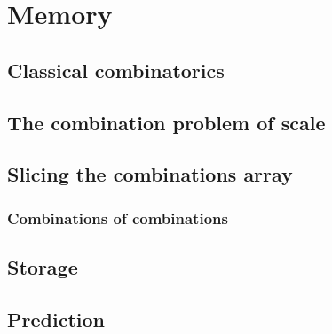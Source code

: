 \chapter{Memory}
\section{Classical combinatorics}

\section{The combination problem of scale}

\section{Slicing the combinations array}
\subsection{Combinations of combinations}
\section{Storage}
\section{Prediction}

